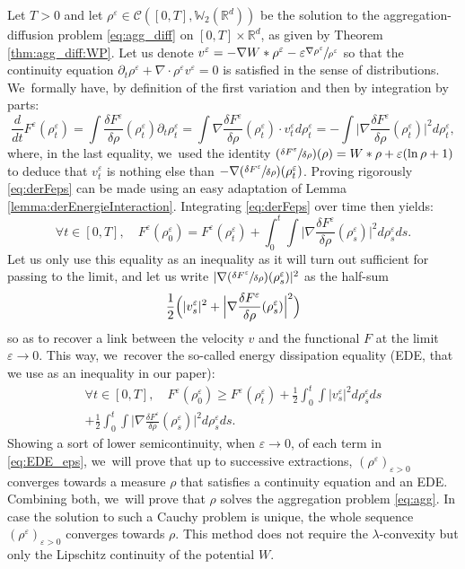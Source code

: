 \documentclass[11pt]{article}
\numberwithin{equation}{section}
\newcommand{\Psfrac}[2]{(\sfrac{#1}{#2})}
\def\RR{\mathbb{R}}
\def\WW{\mathbb{W}}
\def\eps{\varepsilon}
\def\pa{\partial}
\def\calC{{\mathcal C}}
\theoremstyle{plain}
\theoremstyle{definition}
\begin{document}
Let $T>0$ and let $\rho^\eps \in \calC([0,T], \WW_2(\RR^d))$ be the solution to the aggregation-diffusion problem \eqref{eq:agg_diff} on $[0,T] \times \RR^d$, as given by Theorem \ref{thm:agg_diff:WP}. Let us denote $v^\eps = - \nabla W * \rho^\eps - \eps \sfrac{\nabla \rho^\eps}{\rho^\eps}$ so that the continuity equation $\pa_t \rho^\eps + \nabla \cdot \rho^\eps v^\eps = 0$ is satisfied in the sense of distributions. We~formally have, by definition of the first variation and then by integration by parts:
\begin{equation}\label{eq:derFeps}
\frac{d}{dt} F^\eps(\rho_t^\eps) = \int \frac{\delta F^\eps}{\delta \rho}(\rho_t^\eps) \pa_t \rho_t^\eps = \int \nabla \frac{\delta F^\eps}{\delta \rho}(\rho_t^\eps) \cdot v_t^\eps d\rho_t^\eps = - \int \Big| \nabla \frac{\delta F^\eps}{\delta \rho}(\rho_t^\eps) \Big|^2 d\rho_t^\eps,
\end{equation}
where, in the last equality, we~used the identity $\Psfrac{\delta F^\eps}{\delta \rho}(\rho) = W * \rho + \eps (\ln \rho +1)$ to deduce that $v_t^\eps$ is nothing else than $-\nabla \Psfrac{\delta F^\eps}{\delta \rho}(\rho_t^\eps)$. Proving rigorously \eqref{eq:derFeps} can be made using an easy adaptation of Lemma \ref{lemma:derEnergieInteraction}. Integrating \eqref{eq:derFeps} over time then yields:
\[
\forall t \in [0,T], \quad F^\eps(\rho^\eps_0) = F^\eps(\rho^\eps_t) + \int_0^t \int \Big| \nabla \frac{\delta F^\eps}{\delta \rho}(\rho_s^\eps) \Big|^2 d\rho_s^\eps ds.
\]
Let us only use this equality as an inequality as it will turn out sufficient for passing to the limit, and let us write $| \nabla \Psfrac{\delta F^\eps}{\delta \rho}(\rho_s^\eps) |^2$ as the half-sum
\[
\frac 12 \Bigl(|v^\eps_s|^2 + \Big| \nabla \frac{\delta F^\eps}{\delta \rho}(\rho_s^\eps) \Big|^2 \Bigr)
\]
so as to recover a link between the velocity $v$ and the functional $F$ at the limit $\eps \to 0$. This way, we~recover the so-called energy dissipation equality (EDE, that we use as an inequality in our paper):
\begin{multline}\label{eq:EDE_eps}
\forall t \in [0,T], \quad F^\eps(\rho^\eps_0) \geq F^\eps(\rho^\eps_t) + \frac 12 \int_0^t \int |v^\eps_s|^2 d\rho^\eps_s ds\\[-5pt]
+ \frac 12 \int_0^t \int \Big| \nabla \frac{\delta F^\eps}{\delta \rho}(\rho_s^\eps) \Big|^2 d\rho_s^\eps ds.
\end{multline}
Showing a sort of lower semicontinuity, when $\eps \to 0$, of each term in \eqref{eq:EDE_eps}, we~will prove that up to successive extractions, $(\rho^\eps)_{\eps>0}$ converges towards a measure $\rho$ that satisfies a continuity equation and an EDE. Combining both, we~will prove that $\rho$ solves the aggregation problem \eqref{eq:agg}. In case the solution to such a Cauchy problem is unique, the whole sequence $(\rho^\eps)_{\eps>0}$ converges towards $\rho$. This method does not require the $\lambda$-convexity but only the Lipschitz continuity of the potential $W$.
\end{document}
